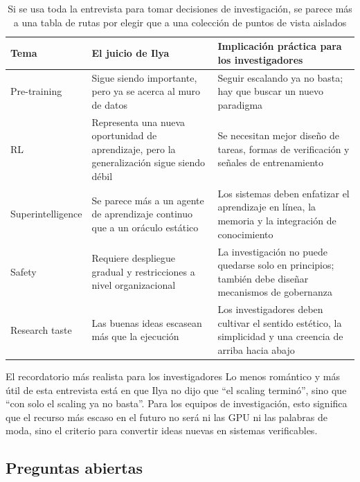 \begin{table}[H]
\centering
\begin{tabular}{p{3.1cm}p{3.8cm}p{4.6cm}}
\toprule
\textbf{Tema} & \textbf{El juicio de Ilya} & \textbf{Implicación práctica para los investigadores} \\
\midrule
Pre-training & Sigue siendo importante, pero ya se acerca al muro de datos & Seguir escalando ya no basta; hay que buscar un nuevo paradigma \\
RL & Representa una nueva oportunidad de aprendizaje, pero la generalización sigue siendo débil & Se necesitan mejor diseño de tareas, formas de verificación y señales de entrenamiento \\
Superintelligence & Se parece más a un agente de aprendizaje continuo que a un oráculo estático & Los sistemas deben enfatizar el aprendizaje en línea, la memoria y la integración de conocimiento \\
Safety & Requiere despliegue gradual y restricciones a nivel organizacional & La investigación no puede quedarse solo en principios; también debe diseñar mecanismos de gobernanza \\
Research taste & Las buenas ideas escasean más que la ejecución & Los investigadores deben cultivar el sentido estético, la simplicidad y una creencia de arriba hacia abajo \\
\bottomrule
\end{tabular}
\caption{Si se usa toda la entrevista para tomar decisiones de investigación, se parece más a una tabla de rutas por elegir que a una colección de puntos de vista aislados}
\end{table}

\begin{importantbox}{El recordatorio más realista para los investigadores}
Lo menos romántico y más útil de esta entrevista está en que Ilya no dijo que ``el scaling terminó'', sino que ``con solo el scaling ya no basta''. Para los equipos de investigación, esto significa que el recurso más escaso en el futuro no será ni las GPU ni las palabras de moda, sino el criterio para convertir ideas nuevas en sistemas verificables.
\end{importantbox}

\subsection{Preguntas abiertas}

